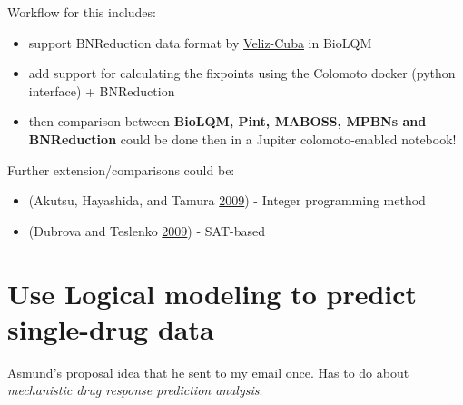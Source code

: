 \documentclass[
  12pt,
]{book}
\providecommand{\tightlist}{%
  \setlength{\itemsep}{0pt}\setlength{\parskip}{0pt}}
\begin{document}
Workflow for this includes:

\begin{itemize}
\tightlist
\item
  support BNReduction data format by \href{https://doi.org/10.1186/1471-2105-15-221}{Veliz-Cuba}
  in BioLQM
\item
  add support for calculating the fixpoints using the Colomoto docker (python
  interface) + BNReduction
\item
  then comparison between \textbf{BioLQM, Pint, MABOSS, MPBNs and BNReduction} could be done then
  in a Jupiter colomoto-enabled notebook!
\end{itemize}

Further extension/comparisons could be:

\begin{itemize}
\tightlist
\item
  (Akutsu, Hayashida, and Tamura \protect\hyperlink{ref-Akutsu2009}{2009}) - Integer programming method
\item
  (Dubrova and Teslenko \protect\hyperlink{ref-Dubrova2009}{2009}) - SAT-based
\end{itemize}

\hypertarget{use-logical-modeling-to-predict-single-drug-data}{%
\section*{Use Logical modeling to predict single-drug data}\label{use-logical-modeling-to-predict-single-drug-data}}

Asmund's proposal idea that he sent to my email once.
Has to do about \emph{mechanistic drug response prediction analysis}:
\end{document}
